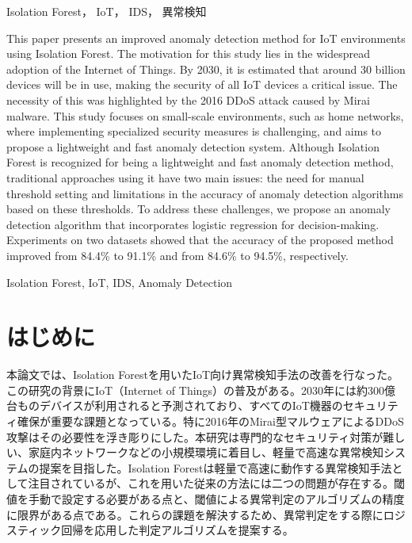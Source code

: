 \documentclass{css}
\begin{document}

\begin{jkeyword}
Isolation Forest， IoT， IDS， 異常検知
\end{jkeyword}

\begin{eabstract}
    This paper presents an improved anomaly detection method for IoT environments using Isolation Forest. The motivation for this study lies in the widespread adoption of the Internet of Things. By 2030, it is estimated that around 30 billion devices will be in use, making the security of all IoT devices a critical issue. The necessity of this was highlighted by the 2016 DDoS attack caused by Mirai malware. This study focuses on small-scale environments, such as home networks, where implementing specialized security measures is challenging, and aims to propose a lightweight and fast anomaly detection system. Although Isolation Forest is recognized for being a lightweight and fast anomaly detection method, traditional approaches using it have two main issues: the need for manual threshold setting and limitations in the accuracy of anomaly detection algorithms based on these thresholds. To address these challenges, we propose an anomaly detection algorithm that incorporates logistic regression for decision-making. Experiments on two datasets showed that the accuracy of the proposed method improved from 84.4\% to 91.1\% and from 84.6\% to 94.5\%, respectively.
\end{eabstract}


\begin{ekeyword}
Isolation Forest, IoT, IDS, Anomaly Detection
\end{ekeyword}


\maketitle

\section{はじめに}


本論文では、Isolation Forestを用いたIoT向け異常検知手法の改善を行なった。この研究の背景にIoT（Internet of Things）の普及がある。2030年には約300億台ものデバイスが利用されると予測されており、すべてのIoT機器のセキュリティ確保が重要な課題となっている。特に2016年のMirai型マルウェアによるDDoS攻撃はその必要性を浮き彫りにした。本研究は専門的なセキュリティ対策が難しい、家庭内ネットワークなどの小規模環境に着目し、軽量で高速な異常検知システムの提案を目指した。Isolation Forestは軽量で高速に動作する異常検知手法として注目されているが、これを用いた従来の方法には二つの問題が存在する。閾値を手動で設定する必要がある点と、閾値による異常判定のアルゴリズムの精度に限界がある点である。これらの課題を解決するため、異常判定をする際にロジスティック回帰を応用した判定アルゴリズムを提案する。
\end{document}
